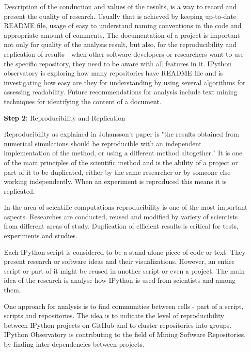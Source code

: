 Description of the conduction and values of the results, is a way to record and present the quality of research. Usually that is achieved by keeping up-to-date README file, usage of easy to understand naming conventions in the code and appropriate amount of comments. The documentation of a project is important not only for quality of the analysis result, but also, for the reproducibility and replication of results - when other software developers or researchers want to use the specific repository, they need to be aware with all features in it. IPython observatory is exploring how many repositories have README file and is investigating how easy are they for understanding by using several algorithms for assessing readability. Future recommendations for analysis include text mining techniques for identifying the content of a document. 


\vspace{5mm}
\begin{mdframed}
\vspace{1px}
\textbf{Step 2:} Reproducibility and Replication
\vspace{1px}
\end{mdframed}
\vspace{2mm}

Reproducibility as explained in Johansson's paper \cite{johansson2014introduction} is "the results obtained from numerical simulations should be reproducible with an independent implementation of the method, or using a different method altogether." It is one of the main principles of the scientific method\cite{cohen2013introduction} and is the ability of a project or part of it to be duplicated, either by the same researcher or by someone else working independently\cite{reproducibilityWiki}. When an experiment is reproduced this means it is replicated.

In the area of scientific computations reproducibility is one of the most important aspects. Researches are conducted, reused and modified by variety of scientists from different areas of study. Duplication of efficient results is critical for tests, experiments and studies.

Each IPython script is considered to be a stand alone piece of code or text. They present research or software ideas and their visualizations. However, an entire script or part of it might be reused in another script or even a project. The main idea of the research is analyse how IPython is used from scientists and among them.

One approach for analysis is to find communities between cells - part of a script, scripts and repositories. The idea is to indicate the level of reproducibility between IPython projects on GitHub and to cluster repositories into groups. IPython Observatory is contributing to the field of Mining Software Repositories, by finding inter-dependencies between projects. 

